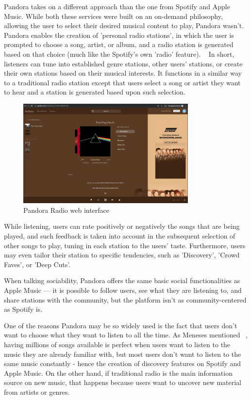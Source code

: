 Pandora takes on a different approach than the one from Spotify and Apple Music. While both these services were built on an on-demand philosophy, allowing the user to select their desired musical content to play, Pandora wasn't. Pandora enables the creation of 'personal radio stations', in which the user is prompted to choose a song, artist, or album, and a radio station is generated based on that choice (much like the Spotify's own 'radio' feature). ~\cite{Meneses2012} In short, listeners can tune into established genre stations, other users' stations, or create their own stations based on their musical interests. It functions in a similar way to a traditional radio station except that users select a song or artist they want to hear and a station is generated based upon such selection. ~\cite{Swanson2013}

\begin{figure}[h]
\centering
\includegraphics[width=0.8\textwidth]{./Images/pandora.png}
\caption{Pandora Radio web interface}
\label{fig:test_env}
\end{figure}

While listening, users can rate positively or negatively the songs that are being played, and such feedback is taken into account in the subsequent selection of other songs to play, tuning in each station to the users' taste. Furthermore, users may even tailor their station to specific tendencies, such as 'Discovery', 'Crowd Faves', or 'Deep Cuts'.

When talking sociability, Pandora offers the same basic social functionalities as Apple Music — it is possible to follow users, see what they are listening to, and share stations with the community, but the platform isn't as community-centered as Spotify is.

One of the reasons Pandora may be so widely used is the fact that users don't want to choose what they want to listen to all the time. As Meneses mentioned ~\cite{Meneses2012}, having millions of songs available is perfect when users want to listen to the music they are already familiar with, but most users don't want to listen to the same music constantly - hence the creation of discovery features on Spotify and Apple Music. On the other hand, if traditional radio is the main information source on new music, that happens because users want to uncover new material from artists or genres.

